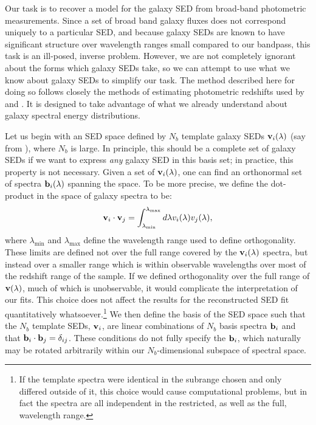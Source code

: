 \documentclass[10pt,preprint]{aastex}
\newcommand{\vv}[1]{{\bf #1}}
\begin{document}
Our task is to recover a model for the galaxy SED from broad-band
photometric measurements. Since a set of broad band galaxy fluxes does
not correspond uniquely to a particular SED, and because galaxy SEDs
are known to have significant structure over wavelength ranges small
compared to our bandpass, this task is an ill-posed, inverse
problem. However, we are not completely ignorant about the forms which
galaxy SEDs take, so we can attempt to use what we know about galaxy
SEDs to simplify our task.  The method described here for doing so
follows closely the methods of estimating photometric redshifts used
by \citet{csabai00a} and \citet{budavari00a}. It is designed to take
advantage of what we already understand about galaxy spectral energy
distributions.

Let us begin with an SED space defined by $N_b$ template galaxy SEDs
$\vv{v}_i(\lambda)$ (say from \citealt{bruzual93a}), where $N_b$ is
large. In principle, this should be a complete set of galaxy SEDs if
we want to express {\it any} galaxy SED in this basis set; in
practice, this property is not necessary.  Given a set of
$\vv{v}_i(\lambda)$, one can find an orthonormal set of spectra
$\vv{b}_i(\lambda)$ spanning the space.  To be more precise, we define
the dot-product in the space of galaxy spectra to be:
\begin{equation}
\vv{v}_i \cdot \vv{v}_j =
\int_{\lambda_{\mathrm{min}}}^{\lambda_{\mathrm{max}}} d\lambda
v_i(\lambda) v_j(\lambda),
\end{equation}
where $\lambda_{\mathrm{min}}$ and $\lambda_{\mathrm{max}}$ define the
wavelength range used to define orthogonality. These limits are
defined not over the full range covered by the $\vv{v}_i(\lambda)$
spectra, but instead over a smaller range which is within observable
wavelengths over most of the redshift range of the sample. If we
defined orthogonality over the full range of $\vv{v}(\lambda)$, much
of which is unobservable, it would complicate the interpretation of
our fits.  This choice does not affect the results for the
reconstructed SED fit quantitatively whatsoever.\footnote{If the
template spectra were identical in the subrange chosen and only
differed outside of it, this choice would cause computational
problems, but in fact the spectra are all independent in the
restricted, as well as the full, wavelength range.}  We then define
the basis of the SED space such that the $N_b$ template SEDs,
$\vv{v}_i$, are linear combinations of $N_b$ basis spectra $\vv{b}_i$
and that $\vv{b}_i \cdot \vv{b}_j = \delta_{ij}$. These conditions do
not fully specify the $\vv{b}_i$, which naturally may be rotated
arbitrarily within our $N_b$-dimensional subspace of spectral space.
\end{document}
